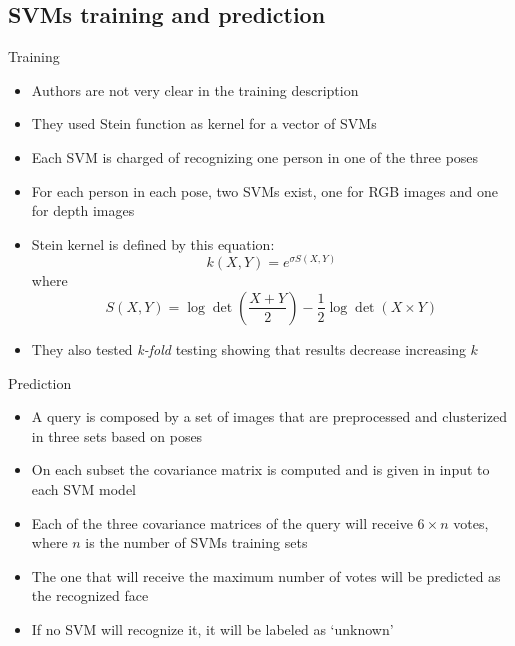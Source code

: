 \documentclass[unknownkeysallowed]{beamer}
\begin{document}
\subsection{SVMs training and prediction}
\begin{frame}{Training}
	\begin{itemize}
		\item Authors are not very clear in the training description
		\item They used Stein function as kernel for a vector of SVMs
		\item Each SVM is charged of recognizing one person in one of
			the three poses
		\item For each person in each pose, two SVMs exist, one for RGB
			images and one for depth images
		\item Stein kernel is defined by this equation:
			$$
			k(X, Y) = e^{\sigma S(X,Y)}
			$$
			where
			$$
			S(X, Y) = \log\det\left(\frac{X +
			Y}{2}\right)-\frac{1}{2} \log \det(X\times Y)
			$$
		\item They also tested \textit{k-fold} testing showing that
			results decrease increasing $k$

	\end{itemize}
\end{frame}

\begin{frame}{Prediction}
	\begin{itemize}
		\item A query is composed by a set of images that are
			preprocessed and clusterized in three sets based on
			poses
		\item On each subset the covariance matrix is computed and is
			given in input to each SVM model
		\item Each of the three covariance matrices of the query will
			receive $6 \times n$ votes, where $n$ is the number of
			SVMs training sets
		\item The one that will receive the maximum number of votes
			will be predicted as the recognized face
		\item If no SVM will recognize it, it will be labeled as
			`unknown'
	\end{itemize}
\end{frame}
\end{document}
